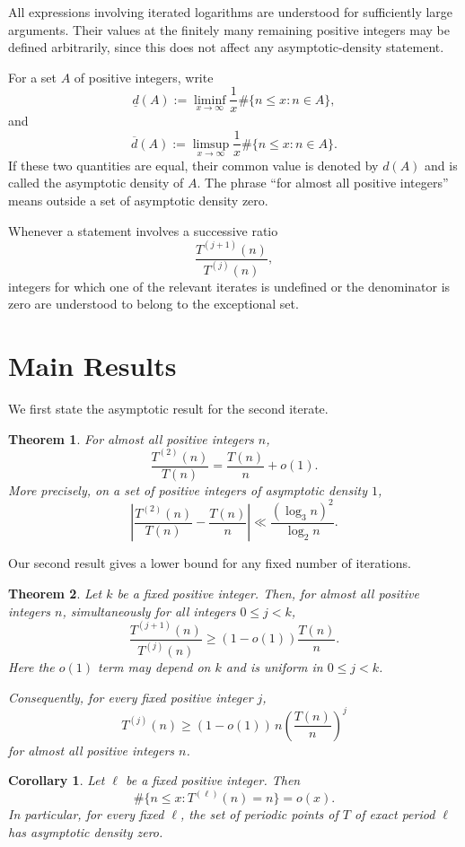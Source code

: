 \documentclass{article}
\newtheorem{theorem}{Theorem}
\newtheorem{corollary}{Corollary}
\begin{document}
All expressions involving iterated logarithms are understood for
sufficiently large arguments. Their values at the finitely many
remaining positive integers may be defined arbitrarily, since this
does not affect any asymptotic-density statement.

For a set $A$ of positive integers, write
\[
\underline d(A)
:=
\liminf_{x\to\infty}
\frac{1}{x}\#\{n\le x:n\in A\},
\]
and
\[
\overline d(A)
:=
\limsup_{x\to\infty}
\frac{1}{x}\#\{n\le x:n\in A\}.
\]
If these two quantities are equal, their common value is denoted by
$d(A)$ and is called the asymptotic density of $A$.
The phrase ``for almost all positive integers'' means outside a set
of asymptotic density zero.


Whenever a statement involves a successive ratio
\[
\frac{T^{(j+1)}(n)}{T^{(j)}(n)},
\]
integers for which one of the relevant iterates is undefined or the
denominator is zero are understood to belong to the exceptional set.

\section{Main Results}

We first state the asymptotic result for the second iterate.

\begin{theorem}\label{thm:second}
For almost all positive integers $n$,
\[
\frac{T^{(2)}(n)}{T(n)}
=
\frac{T(n)}{n}+o(1).
\]
More precisely, on a set of positive integers of asymptotic density
$1$,
\[
\left|
\frac{T^{(2)}(n)}{T(n)}
-
\frac{T(n)}{n}
\right|
\ll
\frac{(\log_3 n)^2}{\log_2 n}.
\]
\end{theorem}


Our second result gives a lower bound for any fixed number of
iterations.

\begin{theorem}\label{thm:lower}
Let $k$ be a fixed positive integer. Then, for almost all positive
integers $n$, simultaneously for all integers $0\le j<k$,
\[
\frac{T^{(j+1)}(n)}{T^{(j)}(n)}
\ge
(1-o(1))\frac{T(n)}{n}.
\]
Here the $o(1)$ term may depend on $k$ and is uniform in
$0\le j<k$.

Consequently, for every fixed positive integer $j$,
\[
T^{(j)}(n)
\ge
(1-o(1))\,n
\left(\frac{T(n)}{n}\right)^j
\]
for almost all positive integers $n$.
\end{theorem}


\begin{corollary}\label{cor:periodic}
Let $\ell$ be a fixed positive integer. Then
\[
\#\{n\le x:T^{(\ell)}(n)=n\}=o(x).
\]
In particular, for every fixed $\ell$, the set of periodic points
of $T$ of exact period $\ell$ has asymptotic density zero.
\end{corollary}
\end{document}
